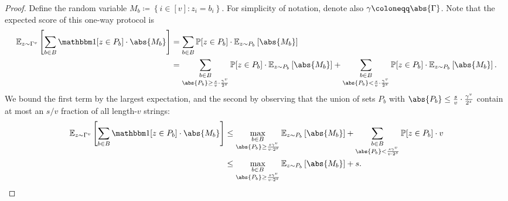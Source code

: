 \documentclass[a4paper,UKenglish,cleveref, autoref, thm-restate]{lipics-v2021}
\theoremstyle{definition}
\newcommand{\E}{\mathbb E}
\renewcommand{\P}{\mathbb P}
\renewcommand{\set}[1]{\left\{#1\right\}}
\newcommand{\vcommitlength}{v}
\newcommand{\vcommitstring}{z}
\newcommand{\alphabet}{\Gamma}
\newcommand{\alphabetsize}{\gamma}
\newcommand{\chf}{\mathbbm 1}
\begin{document}
\begin{proof}
    Define the random variable $M_b \coloneqq \set{i \in [\vcommitlength] : \vcommitstring_i = b_i}$. For simplicity of notation, denote also $\alphabetsize \coloneqq \abs{\alphabet}$. Note that the expected score of this one-way protocol is
    \begin{align*}
        \E_{\vcommitstring \sim \alphabet^\vcommitlength}\left[\sum_{b \in B} \chf[\vcommitstring \in P_b] \cdot \abs{M_b}\right] &= \sum_{b \in B} \P[\vcommitstring \in P_b] \cdot \E_{\vcommitstring \sim P_b}\left[\abs{M_b}\right]\\
        &= \sum_{\substack{b \in B\\\abs{P_b} \geq \frac{s}{\vcommitlength} \cdot \frac{\alphabetsize^\vcommitlength}{2^s}}} \P[\vcommitstring \in P_b] \cdot \E_{\vcommitstring \sim P_b}\left[\abs{M_b}\right] + \sum_{\substack{b \in B\\\abs{P_b} < \frac{s}{\vcommitlength} \cdot \frac{\alphabetsize^\vcommitlength}{2^s}}} \P[\vcommitstring \in P_b] \cdot \E_{\vcommitstring \sim P_b}\left[\abs{M_b}\right].
    \end{align*}
    We bound the first term by the largest expectation, and the second by observing that the union of sets $P_b$ with $\abs{P_b} \leq \frac{s}{\vcommitlength} \cdot \frac{\alphabetsize^\vcommitlength}{2^s}$ contain at most an $s/\vcommitlength$ fraction of all length-$\vcommitlength$ strings:
    \begin{align*}
        \E_{\vcommitstring \sim \alphabet^\vcommitlength}\left[\sum_{b \in B} \chf[\vcommitstring \in P_b] \cdot \abs{M_b}\right] &\leq \max_{\substack{b \in B\\\abs{P_b} \geq \frac{s \alphabetsize^\vcommitlength}{\vcommitlength \cdot 2^s}}} \E_{\vcommitstring \sim P_b}\left[\abs{M_b}\right] + \sum_{\substack{b \in B\\\abs{P_b} < \frac{s \alphabetsize^\vcommitlength}{\vcommitlength \cdot 2^s}}} \P[\vcommitstring \in P_b] \cdot \vcommitlength\\
        &\leq \max_{\substack{b \in B\\\abs{P_b} \geq \frac{s \alphabetsize^\vcommitlength}{\vcommitlength \cdot 2^s}}} \E_{\vcommitstring \sim P_b}\left[\abs{M_b}\right] + s.
    \end{align*}


\end{proof}
\end{document}
